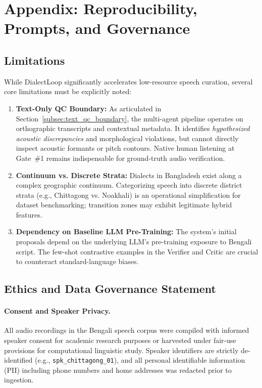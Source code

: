 \section{Appendix: Reproducibility, Prompts, and Governance}
\label{sec:appendix}

\subsection{Limitations}
\label{subsec:limitations}
While DialectLoop significantly accelerates low-resource speech curation, several core limitations must be explicitly noted:
\begin{enumerate}
    \item \textbf{Text-Only QC Boundary:} As articulated in Section~\ref{subsec:text_qc_boundary}, the multi-agent pipeline operates on orthographic transcripts and contextual metadata. It identifies \textit{hypothesized acoustic discrepancies} and morphological violations, but cannot directly inspect acoustic formants or pitch contours. Native human listening at Gate~\#1 remains indispensable for ground-truth audio verification.
    \item \textbf{Continuum vs. Discrete Strata:} Dialects in Bangladesh exist along a complex geographic continuum. Categorizing speech into discrete district strata (e.g., Chittagong vs. Noakhali) is an operational simplification for dataset benchmarking; transition zones may exhibit legitimate hybrid features.
    \item \textbf{Dependency on Baseline LLM Pre-Training:} The system's initial proposals depend on the underlying LLM's pre-training exposure to Bengali script. The few-shot contrastive examples in the Verifier and Critic are crucial to counteract standard-language biases.
\end{enumerate}

\subsection{Ethics and Data Governance Statement}
\label{subsec:ethics}
\paragraph{Consent and Speaker Privacy.}
All audio recordings in the Bengali speech corpus were compiled with informed speaker consent for academic research purposes or harvested under fair-use provisions for computational linguistic study. Speaker identifiers are strictly de-identified (e.g., \texttt{spk\_chittagong\_01}), and all personal identifiable information (PII) including phone numbers and home addresses was redacted prior to ingestion.

